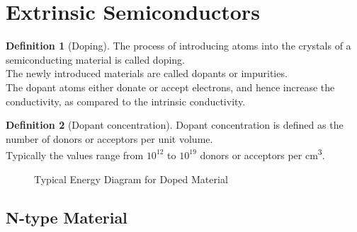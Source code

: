 \documentclass[titlepage, fleqn, a4paper, 12pt, twoside]{article}
\theoremstyle{definition}
\newtheorem{definition}{Definition}
\theoremstyle{theorem}
\let\Oldsection\section
\renewcommand{\section}{\FloatBarrier\Oldsection}
\let\Oldsubsection\subsection
\renewcommand{\subsection}{\FloatBarrier\Oldsubsection}
\begin{document}
\section{Extrinsic Semiconductors}

\begin{definition}[Doping]
	The process of introducing atoms into the crystals of a semiconducting material is called doping.\\
	The newly introduced materials are called dopants or impurities.\\
	The dopant atoms either donate or accept electrons, and hence increase the conductivity, as compared to the intrinsic conductivity.
\end{definition}

\begin{definition}[Dopant concentration]
	Dopant concentration is defined as the number of donors or acceptors per unit volume.\\
	Typically the values range from $10^{12}$ to $10^{19}$ donors or acceptors per \si{\cubic\centi\metre}.
\end{definition}

\begin{figure}[h]
	\centering
	\caption{Typical Energy Diagram for Doped Material}
\end{figure}

\subsection{N-type Material}
\end{document}
